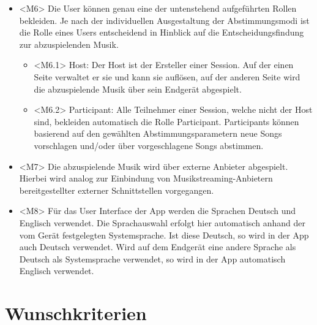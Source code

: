 \documentclass[oneside, ngerman]{sdqtechreport}
\begin{document}
\begin{itemize}
\begin{itemize}
    \end{itemize}
    \item \hypertarget{<M6>}{}<M6> Die User können genau eine der untenstehend aufgeführten Rollen bekleiden. Je nach der individuellen Ausgestaltung der Abstimmungsmodi ist die Rolle eines Users entscheidend in Hinblick auf die Entscheidungsfindung zur abzuspielenden Musik.
    \begin{itemize}
        \item \hypertarget{<M6.1>}{}<M6.1> Host: Der Host ist der Ersteller einer Session. Auf der einen Seite verwaltet er sie und kann sie auflösen, auf der anderen Seite wird die abzuspielende Musik über sein Endgerät abgespielt.
        \item \hypertarget{<M6.2>}{}<M6.2> Participant: Alle Teilnehmer einer Session, welche nicht der Host sind, bekleiden automatisch die Rolle Participant. Participants können basierend auf den gewählten Abstimmungsparametern neue Songs vorschlagen und/oder über vorgeschlagene Songs abstimmen. 
    \end{itemize}
    \item \hypertarget{<M7>}{}<M7> Die abzuspielende Musik wird über externe Anbieter abgespielt. Hierbei wird analog zur Einbindung von Musikstreaming-Anbietern bereitgestellter externer Schnittstellen vorgegangen.
    \item  \hypertarget{<M8>}{}<M8> Für das User Interface der App werden die Sprachen Deutsch und Englisch verwendet. Die Sprachauswahl erfolgt hier automatisch anhand der vom Gerät festgelegten Systemsprache. Ist diese Deutsch, so wird in der App auch Deutsch verwendet. Wird auf dem Endgerät eine andere Sprache als Deutsch als Systemsprache verwendet, so wird in der App automatisch Englisch verwendet.
\end{itemize}

\hypertarget{Wunschkriterien}{}
\section{Wunschkriterien}
\label{sec:Zielbestimmungen:Wunschkriterien}
\end{document}
